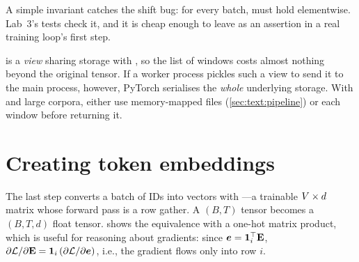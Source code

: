 A simple invariant catches the shift bug: for every batch,  must hold
elementwise. Lab~3's tests check it, and it is cheap enough to leave as an assertion in a real
training loop's first step.

\begin{pitfall}
 is a \emph{view} sharing storage with , so the list of windows costs
almost nothing beyond the original tensor. If a worker process pickles such a view to send it to
the main process, however, PyTorch serialises the \emph{whole} underlying storage. With
 and large corpora, either use memory-mapped files (\cref{sec:text:pipeline})
or  each window before returning it.
\end{pitfall}

\section{Creating token embeddings}\label{sec:text:tokemb}

The last step converts a batch of IDs into vectors with ---a trainable
$V\times d$ matrix whose forward pass is a row gather. A $(B,T)$  tensor becomes a
$(B,T,d)$ float tensor.  shows the equivalence with a one-hot matrix product,
which is useful for reasoning about gradients: since $\bm{e} = \bm{1}_i^\top\mathbf{E}$,
$\partial \mathcal{L}/\partial\mathbf{E} = \bm{1}_i\,(\partial\mathcal{L}/\partial\bm{e})$, i.e.,
the gradient flows only into row $i$.

